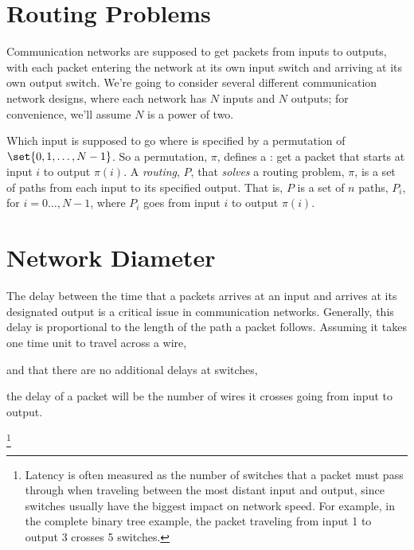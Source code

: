 \section{Routing Problems}

Communication networks are supposed to get packets from inputs to outputs,
with each packet entering the network at its own input switch and arriving
at its own output switch.  We're going to consider several different
communication network designs, where each network has $N$ inputs and
$N$ outputs; for convenience, we'll assume $N$ is a power of two.

Which input is supposed to go where is specified by a permutation of
$\set{0, 1, \dots, N - 1}$.  So a permutation, $\pi$, defines a 
: get a packet that starts at input $i$ to output
$\pi(i)$.  A \emph{routing}, $P$, that \emph{solves} a routing problem,
$\pi$, is a set of paths from each input to its specified output.  That
is, $P$ is a set of $n$ paths, $P_i$, for $i=0\dots,N-1$, where $P_i$ goes
from input $i$ to output $\pi(i)$.

\section{Network Diameter}

The delay between the time that a packets arrives at an input and arrives
at its designated output is a critical issue in communication networks.
Generally, this delay is proportional to the length of the path a packet
follows.  Assuming it takes one time unit to travel across a wire,
\begin{editingnotes}
and that there are no additional delays at switches,
\end{editingnotes}
the delay of a packet will be the number of wires it crosses going from
input to output.

\begin{editingnotes}

\footnote{Latency is often measured as the number of switches that
a packet must pass through when traveling between the most distant input
and output, since switches usually have the biggest impact on network
speed.  For example, in the complete binary tree example, the packet
traveling from input 1 to output 3 crosses 5 switches.}

\end{editingnotes}

